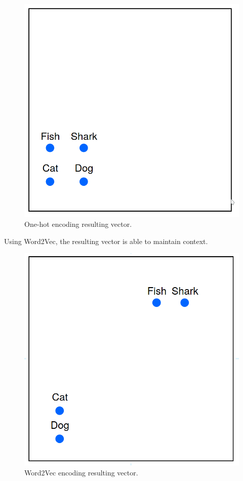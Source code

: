        \begin{figure}[htb]
            \centering
            \includegraphics[scale = 0.1]{Sections/3StateOfTheArt/3_images/one_hot_ex.png}
            \caption{One-hot encoding resulting vector. \cite{word2vec_explained}} 
        \end{figure}


        \par Using Word2Vec, the resulting vector is able to  maintain context.


        \begin{figure}[htb]
            \centering
            \includegraphics[scale = 0.1]{Sections/3StateOfTheArt/3_images/word2vec_encode.png}
            \caption{Word2Vec encoding resulting vector. \cite{word2vec_explained}}
        \end{figure}

